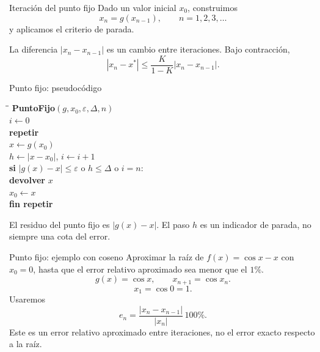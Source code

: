 \documentclass[original_version/main.tex]{subfiles}
\begin{document}
\begin{frame}{Iteración del punto fijo}
Dado un valor inicial $x_0$, construimos\[\boxed{x_n=g(x_{n-1}),\qquad n=1,2,3,\ldots}\]y aplicamos el criterio de parada.\par\medskip La diferencia $|x_n-x_{n-1}|$ es un cambio entre iteraciones. Bajo contracción,\[|x_n-x^*|\le\frac{K}{1-K}|x_n-x_{n-1}|.\]
\end{frame}

\begin{frame}{Punto fijo: pseudocódigo}
\footnotesize\begin{tabbing}\hspace{4mm}\=\hspace{5mm}\=\kill
\textbf{PuntoFijo}$(g,x_0,\varepsilon,\Delta,n)$\\
$i\gets0$\\
\textbf{repetir}\\
\>$x\gets g(x_0)$\\
\>$h\gets|x-x_0|$, $i\gets i+1$\\
\>\textbf{si} $|g(x)-x|\le\varepsilon$ o $h\le\Delta$ o $i=n$:\\
\>\>\textbf{devolver} $x$\\
\>$x_0\gets x$\\
\textbf{fin repetir}
\end{tabbing}\medskip El residuo del punto fijo es $|g(x)-x|$. El paso $h$ es un indicador de parada, no siempre una cota del error.
\end{frame}

\begin{frame}{Punto fijo: ejemplo con coseno}
\small Aproximar la raíz de $f(x)=\cos x-x$ con $x_0=0$, hasta que el error relativo aproximado sea menor que el $1\%$.\[g(x)=\cos x,\qquad x_{n+1}=\cos x_n.\]\[x_1=\cos0=1.\]Usaremos\[e_n=\frac{|x_n-x_{n-1}|}{|x_n|}\,100\%.\]Este es un error relativo aproximado entre iteraciones, no el error exacto respecto a la raíz.
\end{frame}
\end{document}
